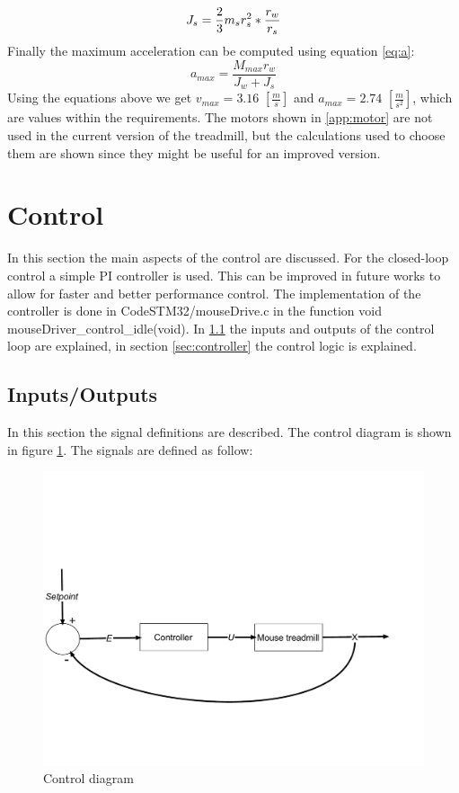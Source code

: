 \documentclass[12pt,a4paper, twoside]{article}
\begin{document}
\begin{equation}\label{eq:J_s}
J_s = \frac{2}{3}m_sr_s^2*\frac{r_w}{r_s}\\
\end{equation}
Finally the maximum acceleration can be computed using equation \ref{eq:a}:
\begin{equation}\label{eq:a}
	a_{max} = \frac{M_{max}r_w}{J_w + J_s}
\end{equation}
Using the equations above we get $v_{max} = 3.16$ $[\frac{m}{s}]$ and $a_{max} = 2.74$ $[\frac{m}{s^2}]$, which are values within the requirements. The motors shown in \ref{app:motor} are not used in the current version of the treadmill, but the calculations used to choose them are shown since they might be useful for an improved version. 

\section{Control} \label{sec:control}
In this section the main aspects of the control are discussed.
For the closed-loop control a simple PI controller is used. This can be improved in future works to allow for faster and better performance control. The implementation of the controller is done in CodeSTM32/mouseDrive.c in the function void mouseDriver\_control\_idle(void). In \ref{sec:I/O} the inputs and outputs of the control loop are explained, in section \ref{sec:controller} the control logic is explained.

\subsection{Inputs/Outputs}\label{sec:I/O}
In this section the signal definitions are described.
The control diagram is shown in figure \ref{fig:ctrl_diag}. The signals are defined as follow:
\begin{figure}[H]
	\centering
	\includegraphics[width=0.8\linewidth]{fig/ctrl_diag.pdf}
	\caption{Control diagram}\label{fig:ctrl_diag}
\end{figure}
\end{document}
